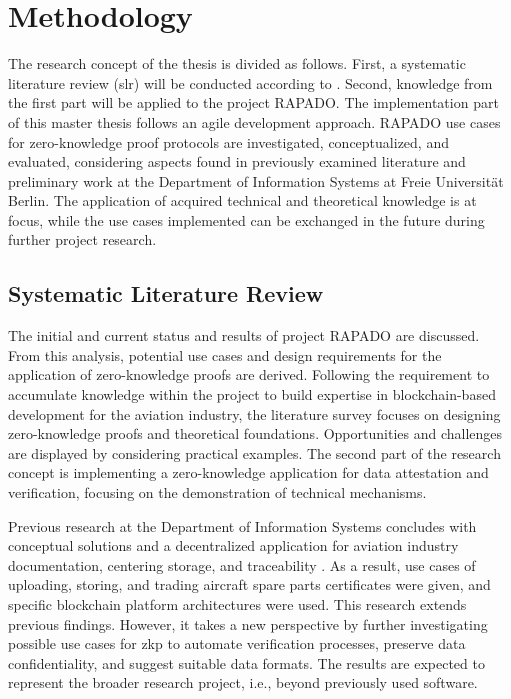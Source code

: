 \chapter{Methodology}
The research concept of the thesis is divided as follows. First, a systematic literature review (\acrshort{slr}) will be conducted according to \cite{vomBrockeJan2019TDgs, Webster2002AnalyzingTP}. Second, knowledge from the first part will be applied to the project RAPADO. The implementation part of this master thesis follows an agile development approach. RAPADO use cases for zero-knowledge proof protocols are investigated, conceptualized, and evaluated, considering aspects found in previously examined literature and preliminary work at the Department of Information Systems at Freie Universit{\"a}t Berlin. The application of acquired technical and theoretical knowledge is at focus, while the use cases implemented can be exchanged in the future during further project research. 

\section{Systematic Literature Review}
The initial and current status and results of project RAPADO are discussed. From this analysis, potential use cases and design requirements for the application of zero-knowledge proofs are derived. Following the requirement to accumulate knowledge within the project to build expertise in blockchain-based development for the aviation industry, the literature survey focuses on designing zero-knowledge proofs and theoretical foundations. Opportunities and challenges are displayed by considering practical examples. The second part of the research concept is implementing a zero-knowledge application for  data attestation and verification, focusing on the demonstration of technical mechanisms.

Previous research at the Department of Information Systems concludes with conceptual solutions and a decentralized application for aviation industry  documentation, centering storage, and traceability \citep{ZedelJ}. As a result, use cases of uploading, storing, and trading aircraft spare parts certificates were given, and specific blockchain platform architectures were used. This research extends previous findings. However, it takes a new perspective by further investigating possible use cases for \acrshort{zkp} to automate verification processes, preserve data confidentiality, and suggest suitable data formats. The results are expected to represent the broader research project, i.e., beyond previously used software.

